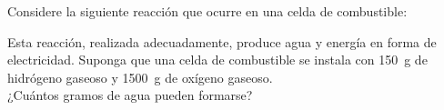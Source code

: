 Considere la siguiente reacción que ocurre en una celda de combustible:
\begin{center}
\end{center}
Esta reacción, realizada adecuadamente, produce agua y energía en forma de electricidad. Suponga que una celda de combustible se instala con \SI{150}{\gram} de hidrógeno gaseoso y \SI{1500}{\gram} de oxígeno gaseoso.\\ 
¿Cuántos gramos de agua pueden formarse?
